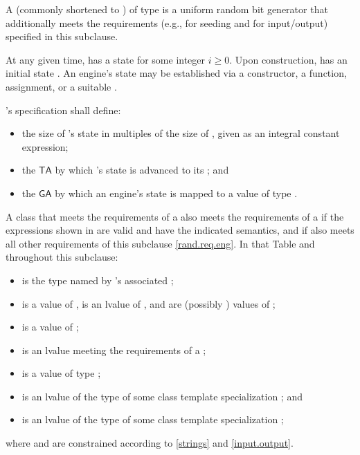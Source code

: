 \pnum
A 
(commonly shortened to )
 of type 
is a uniform random bit generator
that additionally meets the requirements
(e.g., for seeding and for input/output)
specified in this subclause.

\pnum
At any given time,
 has a state 
for some integer $i \geq 0$.
Upon construction,
has an initial state .
An engine's state may be established via
 a constructor,
 a  function,
 assignment,
 or a suitable .

\pnum
{}'s specification shall define:
\begin{itemize}
 \item
   the size of 's state
   in multiples of the size of ,
   given as an integral constant expression;
 \item
   the 
   $\mathsf{TA}$
   by which 's state 
   is advanced to its 
   ;
 and
 \item
   the 
   $\mathsf{GA}$
   by which an engine's state is mapped
   to a value of type .
\end{itemize}

\pnum
A class 
that meets the requirements
of a 
also meets the requirements
of a 
if the expressions shown
in 
are valid and have the indicated semantics,
and if  also meets all other requirements
of this subclause \ref{rand.req.eng}.
In that Table and throughout this subclause:
\begin{itemize}
  \item
     is the type named by
    's associated ;
  \item
     is a value of ,
     is an lvalue of ,
     and  are (possibly ) values of ;
  \item
     is a value of ;
  \item
     is an lvalue
    meeting the requirements of a ;
  \item
     is a value
    of type ;
  \item
     is an lvalue of the type of some class template specialization
     ;
  and
  \item
     is an lvalue of the type of some class template specialization
     ;
\end{itemize}
where  and  are constrained
according to \ref{strings} and \ref{input.output}.

